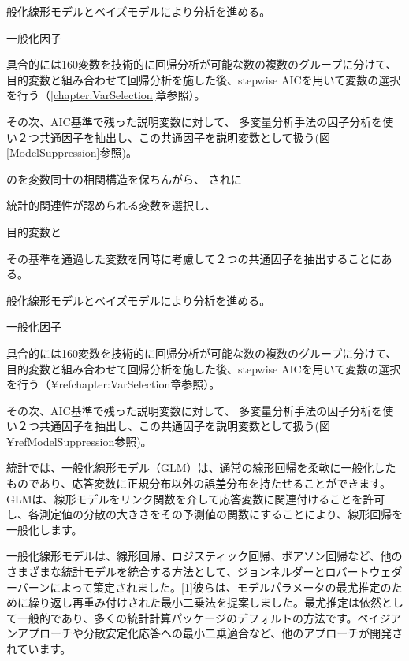 \documentclass[a4j,11pt,mc]{jreport}
\begin{document}
般化線形モデルとベイズモデルにより分析を進める。

一般化因子


具合的には160変数を技術的に回帰分析が可能な数の複数のグループに分けて、
目的変数と組み合わせて回帰分析を施した後、stepwise
AICを用いて変数の選択を行う（\ref{chapter:VarSelection}章参照）。


その次、AIC基準で残った説明変数に対して、
多変量分析手法の因子分析を使い２つ共通因子を抽出し、この共通因子を説明変数として扱う(図\ref{ModelSuppression}参照)。






のを変数同士の相関構造を保ちんがら、
されに

統計的関連性が認められる変数を選択し、


目的変数と





その基準を通過した変数を同時に考慮して２つの共通因子を抽出することにある。


般化線形モデルとベイズモデルにより分析を進める。

一般化因子


具合的には160変数を技術的に回帰分析が可能な数の複数のグループに分けて、
目的変数と組み合わせて回帰分析を施した後、stepwise
AICを用いて変数の選択を行う（¥ref{chapter:VarSelection}章参照）。


その次、AIC基準で残った説明変数に対して、
多変量分析手法の因子分析を使い２つ共通因子を抽出し、この共通因子を説明変数として扱う(図¥ref{ModelSuppression}参照)。







統計では、一般化線形モデル（GLM）は、通常の線形回帰を柔軟に一般化したものであり、応答変数に正規分布以外の誤差分布を持たせることができます。 GLMは、線形モデルをリンク関数を介して応答変数に関連付けることを許可し、各測定値の分散の大きさをその予測値の関数にすることにより、線形回帰を一般化します。

一般化線形モデルは、線形回帰、ロジスティック回帰、ポアソン回帰など、他のさまざまな統計モデルを統合する方法として、ジョンネルダーとロバートウェダーバーンによって策定されました。[1]彼らは、モデルパラメータの最尤推定のために繰り返し再重み付けされた最小二乗法を提案しました。最尤推定は依然として一般的であり、多くの統計計算パッケージのデフォルトの方法です。ベイジアンアプローチや分散安定化応答への最小二乗適合など、他のアプローチが開発されています。
\end{document}
